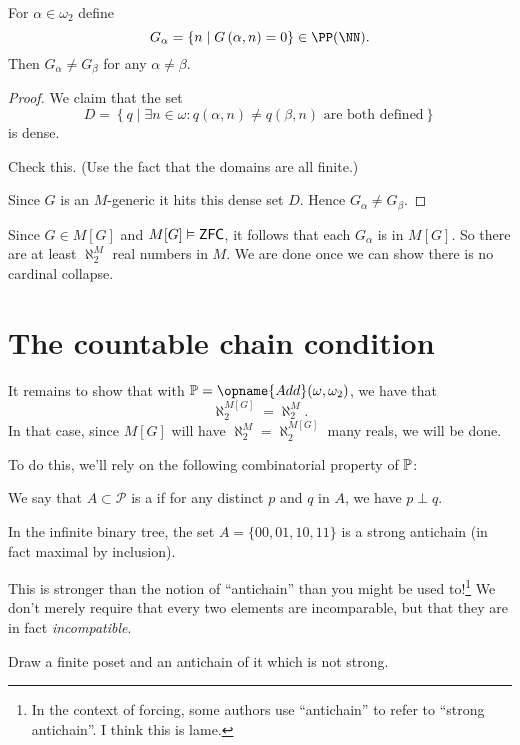 \begin{lemma}
	For $\alpha \in \omega_2$ define
	\[ G_\alpha = \left\{ n \mid G\left( \alpha,n \right) = 0 \right\} \in \PP(\NN). \]
	Then $G_\alpha \neq G_\beta$ for any $\alpha \neq \beta$.
\end{lemma}
\begin{proof}
	We claim that the set
	\[ D = \left\{ q \mid \exists n \in \omega :
		q\left( \alpha, n \right) \neq q\left( \beta, n \right)
		\text{ are both defined}
	\right\} \]
	is dense.
	\begin{ques}
		Check this.
		(Use the fact that the domains are all finite.)
	\end{ques}

	Since $G$ is an $M$-generic it hits this dense set $D$.
	Hence $G_\alpha \neq G_\beta$.
\end{proof}

Since $G \in M[G]$ and $M[G] \vDash \mathsf{ZFC}$,
it follows that each $G_\alpha$ is in $M[G]$.
So there are at least $\aleph_2^M$ real numbers in $M$.
We are done once we can show there is no cardinal collapse.

\section{The countable chain condition}
It remains to show that with $\Po = \opname{Add}(\omega, \omega_2)$, we have that
\[ \aleph_2^{M[G]} = \aleph_2^M. \]
In that case, since $M[G]$ will have $\aleph_2^M = \aleph_2^{M[G]}$ many reals, we will be done.

To do this, we'll rely on the following combinatorial property of $\mathbb P$:

\begin{definition}
	We say that $A \subset \mathcal P$ is a 
	if for any distinct $p$ and $q$ in $A$, we have $p \perp q$.
\end{definition}
\begin{example}
	In the infinite binary tree, 
	the set $A = \{00, 01, 10, 11\}$ is a strong antichain
	(in fact maximal by inclusion).
\end{example}
This is stronger than the notion of ``antichain'' than you might be used to!\footnote{%
	In the context of forcing, some authors use ``antichain'' to refer to ``strong antichain''.
	I think this is lame.}
We don't merely require that every two elements are incomparable,
but that they are in fact \emph{incompatible}.
\begin{ques}
	Draw a finite poset and an antichain of it which is not strong.
\end{ques}

